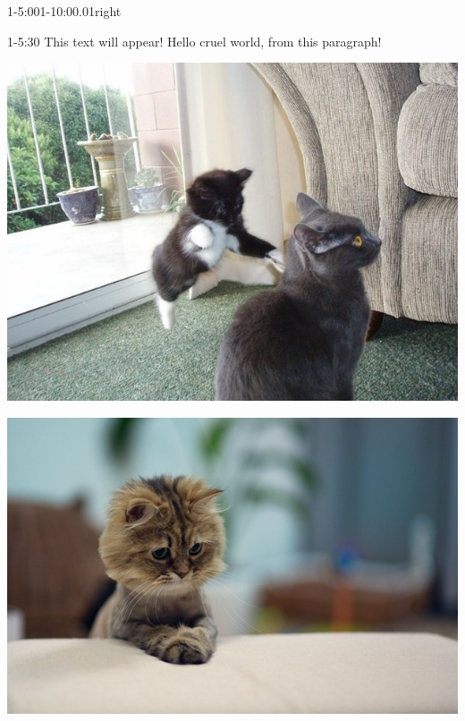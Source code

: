 \begin{vsvframe}{1-5:00}{1-10:00.01}{right}

\begin{vsvappear}{1-5:30}{}
This text will appear! Hello cruel world, from this paragraph!
\end{vsvappear}

\begin{enumerate}
\includegraphics[scale=0.2]{img/0001.jpg}

\includegraphics[scale=0.2]{img/0002.jpg}


\end{enumerate}
\end{vsvframe}

